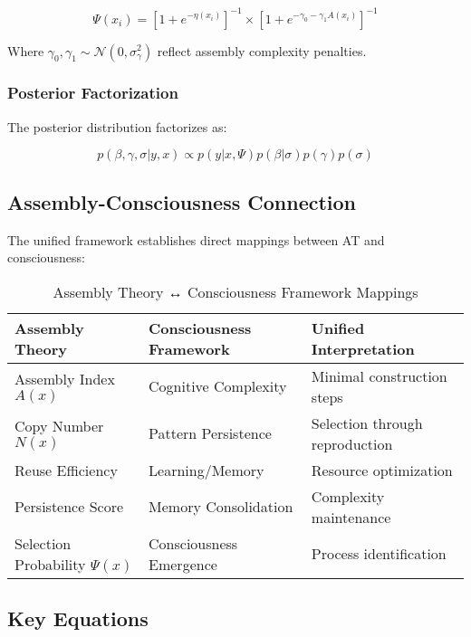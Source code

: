 \documentclass[11pt,a4paper]{article}
\begin{document}
\begin{equation}
\Psi(x_i) = [1 + e^{-\eta(x_i)}]^{-1} \times [1 + e^{-\gamma_0 - \gamma_1 A(x_i)}]^{-1}
\label{eq:multiplicative_penalty}
\end{equation}

Where \( \gamma_0, \gamma_1 \sim \mathcal{N}(0, \sigma_\gamma^2) \) reflect assembly complexity penalties.

\subsubsection{Posterior Factorization}
The posterior distribution factorizes as:

\begin{equation}
p(\beta, \gamma, \sigma | y, x) \propto p(y|x, \Psi) p(\beta|\sigma) p(\gamma) p(\sigma)
\label{eq:posterior}
\end{equation}

\subsection{Assembly-Consciousness Connection}
\label{subsec:assembly_consciousness}

The unified framework establishes direct mappings between AT and consciousness:

\begin{table}[H]
\centering
\caption{Assembly Theory ↔ Consciousness Framework Mappings}
\label{tab:mappings}
\begin{tabular}{@{}lll@{}}
\toprule
Assembly Theory & Consciousness Framework & Unified Interpretation \\
\midrule
Assembly Index \( A(x) \) & Cognitive Complexity & Minimal construction steps \\
Copy Number \( N(x) \) & Pattern Persistence & Selection through reproduction \\
Reuse Efficiency & Learning/Memory & Resource optimization \\
Persistence Score & Memory Consolidation & Complexity maintenance \\
Selection Probability \( \Psi(x) \) & Consciousness Emergence & Process identification \\
\bottomrule
\end{tabular}
\end{table}

\subsection{Key Equations}
\label{subsec:key_equations}
\end{document}
